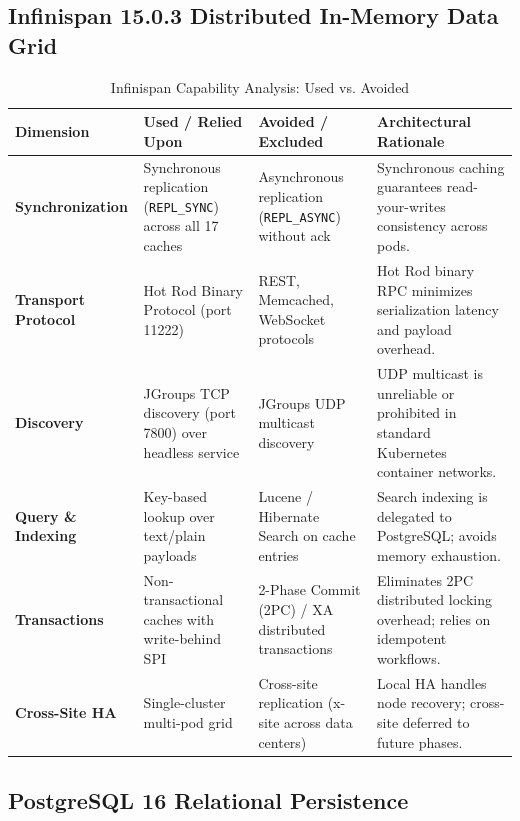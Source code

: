 \subsection{Infinispan 15.0.3 Distributed In-Memory Data Grid}

\begin{table}[htbp]
\centering
\scriptsize
\begin{tabularx}{\textwidth}{P{3.0cm} P{3.8cm} P{3.8cm} Y}
\toprule
\textbf{Dimension} & \textbf{Used / Relied Upon} & \textbf{Avoided / Excluded} & \textbf{Architectural Rationale} \\
\midrule
\textbf{Synchronization} & Synchronous replication (\nolinkurl{REPL_SYNC}) across all 17 caches & Asynchronous replication (\nolinkurl{REPL_ASYNC}) without ack & Synchronous caching guarantees read-your-writes consistency across pods. \\
\addlinespace
\textbf{Transport Protocol} & Hot Rod Binary Protocol (port 11222) & REST, Memcached, WebSocket protocols & Hot Rod binary RPC minimizes serialization latency and payload overhead. \\
\addlinespace
\textbf{Discovery} & JGroups TCP discovery (port 7800) over headless service & JGroups UDP multicast discovery & UDP multicast is unreliable or prohibited in standard Kubernetes container networks. \\
\addlinespace
\textbf{Query \& Indexing} & Key-based lookup over text/plain payloads & Lucene / Hibernate Search on cache entries & Search indexing is delegated to PostgreSQL; avoids memory exhaustion. \\
\addlinespace
\textbf{Transactions} & Non-transactional caches with write-behind SPI & 2-Phase Commit (2PC) / XA distributed transactions & Eliminates 2PC distributed locking overhead; relies on idempotent workflows. \\
\addlinespace
\textbf{Cross-Site HA} & Single-cluster multi-pod grid & Cross-site replication (x-site across data centers) & Local HA handles node recovery; cross-site deferred to future phases. \\
\bottomrule
\end{tabularx}
\caption{Infinispan Capability Analysis: Used vs. Avoided}
\label{tab:infinispan_used_vs_avoided}
\end{table}

\subsection{PostgreSQL 16 Relational Persistence}

